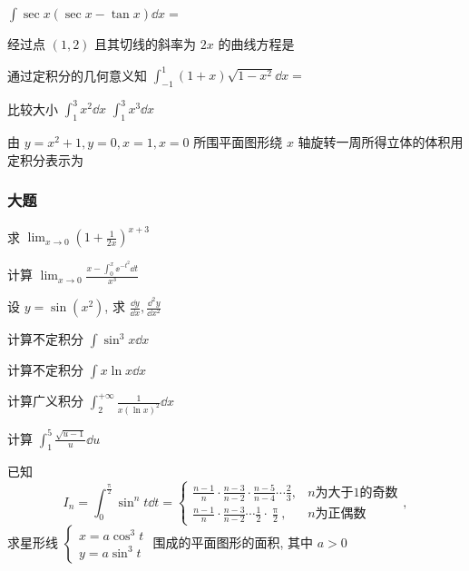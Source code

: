 \begin{ti}
	$\int\sec x(\sec x-\tan x)\dd{x}=$ \hua
\end{ti}

\begin{ti}
	经过点 $(1,2)$ 且其切线的斜率为 $2x$ 的曲线方程是 \hua
\end{ti}

\begin{ti}
	通过定积分的几何意义知 $\int_{-1}^{1}(1+x)\sqrt{1-x^2}\dd{x}=$ \hua
\end{ti}

\begin{ti}
	比较大小 $\int_{1}^{3}x^2\dd{x}$ \hua{} $\int_{1}^{3}x^3\dd{x}$
\end{ti}

\begin{ti}
	由 $y=x^2+1,y=0,x=1,x=0$ 所围平面图形绕 $x$ 轴旋转一周所得立体的体积用定积分表示为 \hua
\end{ti}

\subsubsection{大题}
\begin{ti}
	求 $\lim_{x\to0}\left(1+\frac{1}{2x}\right)^{x+3}$
\end{ti}

\begin{ti}
	计算 $\lim_{x\to0}\frac{ x-\int_0^x\ee^{-t^2}\dd{t}}{x^3}$
\end{ti}

\begin{ti}
	设 $y=\sin\left(x^2\right)$, 求 $\frac{\dd{y}}{\dd{x}},\frac{\dd^2{y}}{\dd{x^2}}$
\end{ti}

\begin{ti}
	计算不定积分 $\int\sin^3x\dd{x}$
\end{ti}

\begin{ti}
	计算不定积分 $\int x\ln x\dd{x}$
\end{ti}

\begin{ti}
	计算广义积分 $\int_{2}^{+\infty}\frac{1}{x(\ln x)^2}\dd{x}$
\end{ti}

\begin{ti}
	计算 $\int_{1}^{5}\frac{\sqrt{u-1}}{u}\dd{u}$
\end{ti}

\begin{ti}
	已知
	\[
	I_n=\int_{0}^{\frac{\uppi}{2}}\sin^nt\dd{t}=
	\begin{cases}
	\frac{n-1}{n}\cdot\frac{n-3}{n-2}\cdot\frac{n-5}{n-4}\cdots\frac{2}{3}, & n\text{为大于}1\text{的奇数}\\
	\frac{n-1}{n}\cdot\frac{n-3}{n-2}\cdots\frac{1}{2}\cdot\frac{\uppi}{2}, & n\text{为正偶数}
	\end{cases},
	\]
	求星形线 $
	\begin{cases}
	x=a\cos^3t\\
	y=a\sin^3t
	\end{cases}
	$ 围成的平面图形的面积, 其中 $a>0$
\end{ti}

